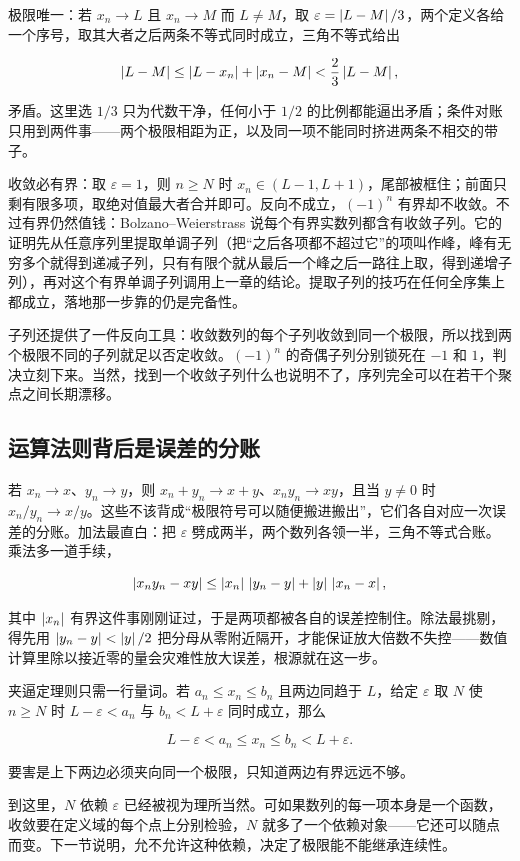 极限唯一：若 \(x_n\to L\) 且 \(x_n\to M\) 而 \(L\ne M\)，取 \(\varepsilon=\left|L-M\right|/3\)，两个定义各给一个序号，取其大者之后两条不等式同时成立，三角不等式给出

\[
\left|L-M\right| \le \left|L-x_n\right|+\left|x_n-M\right| < \frac23\left|L-M\right|,
\]

矛盾。这里选 \(1/3\) 只为代数干净，任何小于 \(1/2\) 的比例都能逼出矛盾；条件对账只用到两件事——两个极限相距为正，以及同一项不能同时挤进两条不相交的带子。

收敛必有界：取 \(\varepsilon=1\)，则 \(n\ge N\) 时 \(x_n\in(L-1,L+1)\)，尾部被框住；前面只剩有限多项，取绝对值最大者合并即可。反向不成立，\((-1)^n\) 有界却不收敛。不过有界仍然值钱：Bolzano--Weierstrass 说每个有界实数列都含有收敛子列。它的证明先从任意序列里提取单调子列（把``之后各项都不超过它''的项叫作峰，峰有无穷多个就得到递减子列，只有有限个就从最后一个峰之后一路往上取，得到递增子列），再对这个有界单调子列调用上一章的结论。提取子列的技巧在任何全序集上都成立，落地那一步靠的仍是完备性。

子列还提供了一件反向工具：收敛数列的每个子列收敛到同一个极限，所以找到两个极限不同的子列就足以否定收敛。\((-1)^n\) 的奇偶子列分别锁死在 \(-1\) 和 \(1\)，判决立刻下来。当然，找到一个收敛子列什么也说明不了，序列完全可以在若干个聚点之间长期漂移。

\subsection{运算法则背后是误差的分账}

若 \(x_n\to x\)、\(y_n\to y\)，则 \(x_n+y_n\to x+y\)、\(x_ny_n\to xy\)，且当 \(y\ne0\) 时 \(x_n/y_n\to x/y\)。这些不该背成``极限符号可以随便搬进搬出''，它们各自对应一次误差的分账。加法最直白：把 \(\varepsilon\) 劈成两半，两个数列各领一半，三角不等式合账。乘法多一道手续，

\[
\left|x_ny_n-xy\right| \le \left|x_n\right|\,\left|y_n-y\right| + \left|y\right|\,\left|x_n-x\right|,
\]

其中 \(\left|x_n\right|\) 有界这件事刚刚证过，于是两项都被各自的误差控制住。除法最挑剔，得先用 \(\left|y_n-y\right|<\left|y\right|/2\) 把分母从零附近隔开，才能保证放大倍数不失控——数值计算里除以接近零的量会灾难性放大误差，根源就在这一步。

夹逼定理则只需一行量词。若 \(a_n\le x_n\le b_n\) 且两边同趋于 \(L\)，给定 \(\varepsilon\) 取 \(N\) 使 \(n\ge N\) 时 \(L-\varepsilon<a_n\) 与 \(b_n<L+\varepsilon\) 同时成立，那么

\[
L-\varepsilon < a_n \le x_n \le b_n < L+\varepsilon.
\]

要害是上下两边必须夹向同一个极限，只知道两边有界远远不够。

到这里，\(N\) 依赖 \(\varepsilon\) 已经被视为理所当然。可如果数列的每一项本身是一个函数，收敛要在定义域的每个点上分别检验，\(N\) 就多了一个依赖对象——它还可以随点而变。下一节说明，允不允许这种依赖，决定了极限能不能继承连续性。
